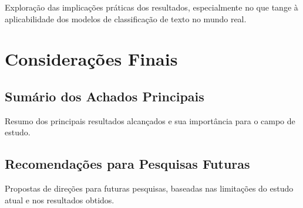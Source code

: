 Exploração das implicações práticas dos resultados, especialmente no que tange à aplicabilidade dos modelos de classificação de texto no mundo real.

\section{Considerações Finais}

\subsection{Sumário dos Achados Principais}

Resumo dos principais resultados alcançados e sua importância para o campo de estudo.

\subsection{Recomendações para Pesquisas Futuras}

Propostas de direções para futuras pesquisas, baseadas nas limitações do estudo atual e nos resultados obtidos.




